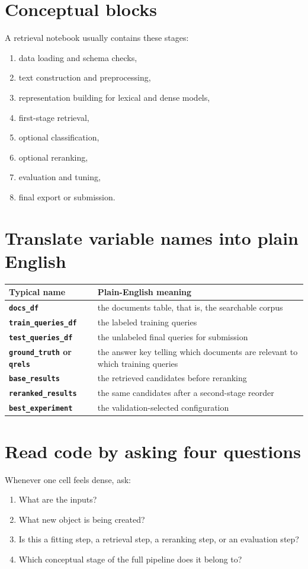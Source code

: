 \documentclass[11pt,oneside]{report}
\newcommand{\code}[1]{\texttt{#1}}
\begin{document}
\section*{Conceptual blocks}
A retrieval notebook usually contains these stages:
\begin{enumerate}
\item data loading and schema checks,
\item text construction and preprocessing,
\item representation building for lexical and dense models,
\item first-stage retrieval,
\item optional classification,
\item optional reranking,
\item evaluation and tuning,
\item final export or submission.
\end{enumerate}

\section*{Translate variable names into plain English}
\begin{center}
\begin{tabularx}{\textwidth}{>{\bfseries}lY}
\toprule
Typical name & Plain-English meaning \\
\midrule
\code{docs\_df} & the documents table, that is, the searchable corpus \\
\code{train\_queries\_df} & the labeled training queries \\
\code{test\_queries\_df} & the unlabeled final queries for submission \\
\code{ground\_truth} or \code{qrels} & the answer key telling which documents are relevant to which training queries \\
\code{base\_results} & the retrieved candidates before reranking \\
\code{reranked\_results} & the same candidates after a second-stage reorder \\
\code{best\_experiment} & the validation-selected configuration \\
\bottomrule
\end{tabularx}
\end{center}

\section*{Read code by asking four questions}
Whenever one cell feels dense, ask:
\begin{enumerate}
\item What are the inputs?
\item What new object is being created?
\item Is this a fitting step, a retrieval step, a reranking step, or an evaluation step?
\item Which conceptual stage of the full pipeline does it belong to?
\end{enumerate}
\end{document}
